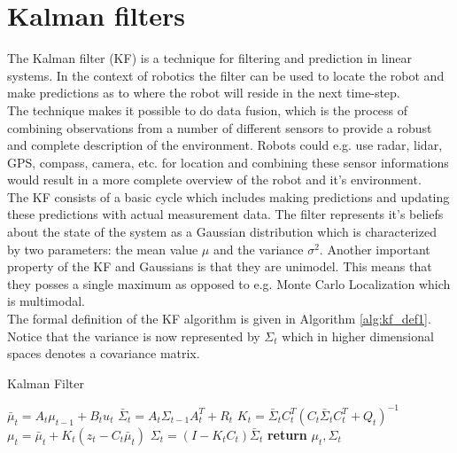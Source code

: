 
\section{Kalman filters}

The Kalman filter (KF) is a technique for filtering and prediction in linear systems. In the context of robotics the filter can be used to locate the robot and make predictions as to where the robot will reside in the next time-step.\\

The technique makes it possible to do data fusion, which is the process of combining observations from a number of different sensors to provide a robust and complete description of the environment. Robots could e.g. use radar, lidar, GPS, compass, camera, etc. for location and combining these sensor informations would result in a more complete overview of the robot and it's environment.\\

The KF consists of a basic cycle which includes making predictions and updating these predictions with actual measurement data. The filter represents it's beliefs about the state of the system as a Gaussian distribution which is characterized by two parameters: the mean value $\mu$ and the variance $\sigma^2$. Another important property of the KF and Gaussians is that they are unimodel. This means that they posses a single maximum as opposed to e.g. Monte Carlo Localization which is multimodal.\\

The formal definition of the KF algorithm is given in Algorithm \ref{alg:kf_def1}. Notice that the variance is now represented by $\Sigma_{t}$ which in higher dimensional spaces denotes a covariance matrix.

\begin{center}
\begin{minipage}{.65\linewidth}
\begin{algorithm}[H]
\caption{Kalman Filter}
\label{alg:kf_def1}
\begin{algorithmic}[1]
  \State $\bar\mu_{t} = A_{t}\mu_{t-1} + B_{t}u_{t}$%
  \State $\bar\Sigma_{t} = A_{t}\Sigma_{t-1}A_{t}^T + R_{t}$
  \State $K_{t} = \bar\Sigma_{t}C_{t}^T(C_{t}\bar{\Sigma}_{t}C_{t}^T+Q_{t})^{-1}$
  \State $\mu_{t} = \bar\mu_{t} + K_{t}(z_{t} - C_{t}\bar\mu_{t})$
  \State $\Sigma_{t} = (I - K_{t}C_{t})\bar\Sigma_{t}$
  \State \textbf{return} $\mu_{t}, \Sigma_{t}$
\EndProcedure
\end{algorithmic}
\end{algorithm}
\end{minipage}
\end{center}


